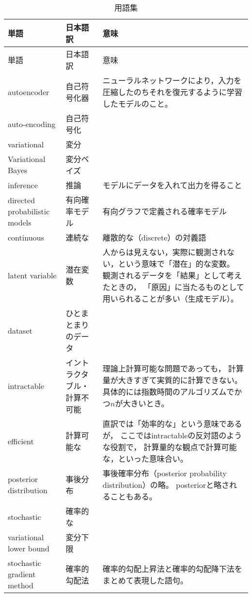\documentclass[dvipdfmx, fleqn]{jsarticle}
\begin{document}
\begin{longtable}{p{4cm}p{4cm}p{7cm}}
    \caption{用語集}
    \label{tab:terms}
    \\ \hline
    単語 & 日本語訳 & 意味 \tabularnewline \hline \hline
    \endfirsthead
    単語 & 日本語訳 & 意味 \tabularnewline \hline \hline
    \endhead
        autoencoder
            & 自己符号化器
            & ニューラルネットワークにより，入力を圧縮したのちそれを復元するように学習したモデルのこと。
            \tabularnewline \hline
        auto-encoding
            & 自己符号化
            & 
            \tabularnewline \hline
        variational
            & 変分
            & 
            \tabularnewline \hline
        Variational Bayes
            & 変分ベイズ
            & 
            \tabularnewline \hline
        inference
            & 推論
            & モデルにデータを入れて出力を得ること
            \tabularnewline \hline
        directed probabilistic models
            & 有向確率モデル
            & 有向グラフで定義される確率モデル
            \tabularnewline \hline
        continuous
            & 連続な
            & 離散的な（discrete）の対義語
            \tabularnewline \hline
        latent variable
            & 潜在変数
            & 人からは見えない，実際に観測されない，という意味で「潜在」的な変数。
            観測されるデータを「結果」として考えたときの，
            「原因」に当たるものとして用いられることが多い（生成モデル）。
            \tabularnewline \hline
        dataset
            & ひとまとまりのデータ
            & 
            \tabularnewline \hline
        intractable
            & イントラクタブル・計算不可能
            & 理論上計算可能な問題であっても，
            計算量が大きすぎて実質的に計算できない。
            具体的には指数時間のアルゴリズムでかつ\(n\)が大きいとき。
            \tabularnewline \hline
        efficient
            & 計算可能な
            & 直訳では「効率的な」という意味であるが，
            ここではintractableの反対語のような役割で，
            計算量的な観点で計算可能な，といった意味合い。
            \tabularnewline \hline
        posterior distribution
            & 事後分布
            & 事後確率分布（posterior probability distribution）の略。
            posteriorと略されることもある。
            \tabularnewline \hline
        stochastic
            & 確率的な
            & 
            \tabularnewline \hline
        variational lower bound
            & 変分下限
            & 
            \tabularnewline \hline
        stochastic gradient method
            & 確率的勾配法
            & 確率的勾配上昇法と確率的勾配降下法をまとめて表現した語句。

\end{longtable}
\end{document}
